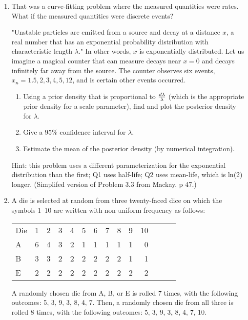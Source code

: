 \documentclass[12pt]{book}
\theoremstyle{definition}
\begin{document}
\begin{enumerate}
\item
That was a curve-fitting problem where the measured quantities were rates.  What if the measured quantities were discrete events?

"Unstable particles are emitted from a source and decay at a distance $x$, a real number that has an exponential probability distribution with characteristic length $\lambda$."  In other words, $x$ is exponentially distributed. Let us imagine a magical counter that can measure decays near $x=0$ and decays infinitely far away from the source. The counter observes six events, ${x_n} =  {1.5,2,3,4,5,12}$, and is certain other events occurred. 

\begin{enumerate}[label=\alph*)]
  \item 	Using a prior density that is proportional to ${d\lambda }\over {\lambda}$ (which is the appropriate prior density for a scale parameter), find and plot the posterior density for $\lambda$. 
  \item  Give a 95\% confidence interval for $\lambda$.
  \item  Estimate the mean of the posterior density (by numerical integration).
\end{enumerate}
Hint:  this problem uses a different parameterization for the exponential distribution than the first; Q1 uses half-life; Q2 uses mean-life, which is ln(2) longer. 
(Simplifed version of Problem 3.3 from Mackay, p 47.)

\item\label{loadeddie} A die is selected at random from three twenty-faced dice on which the symbols 1–10 are written with non-uniform frequency as follows: 

\begin{tabular} {l r r r r r r r r r r r r r}
Die & 1 & 2 & 3 & 4 & 5 & 6 & 7 & 8 & 9 & 10 \\
A & 6 & 4 & 3 & 2 & 1 & 1 & 1 & 1 & 1 & 0  \\
B & 3 & 3 & 2 & 2 & 2 & 2 & 2 & 2 & 1 & 1 \\
E & 2 & 2 & 2 & 2 & 2 & 2 & 2 & 2 & 2 & 2 \\
\end{tabular}

A randomly chosen die from A, B, or E is rolled 7 times, with the following outcomes: 5, 3, 9, 3, 8, 4, 7. Then, a randomly chosen die from all three is rolled 8 times, with the following outcomes: 5, 3, 9, 3, 8, 4, 7, 10. 


\end{enumerate}
\end{document}
